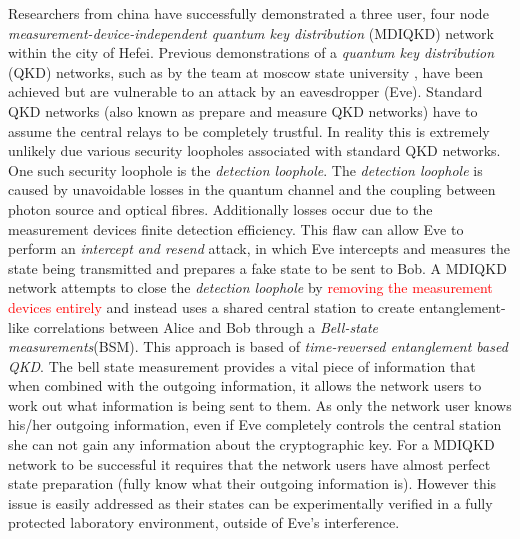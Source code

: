 \documentclass[journal]{vgtc}
\begin{document}
Researchers from china have successfully demonstrated a three user, four node \textit{measurement-device-independent quantum key distribution} (MDIQKD) network within the city of Hefei. Previous demonstrations of a \textit{quantum key distribution} (QKD) networks, such as by the team at moscow state university\cite{2017QuEle..47..798K} , have been achieved but are vulnerable to an attack by an eavesdropper (Eve). Standard QKD networks (also known as prepare and measure QKD networks) have to assume the central relays to be completely trustful. In reality this is extremely unlikely due various security loopholes associated with standard QKD networks. One such security loophole is the \textit{detection loophole}. The \textit{detection loophole} is caused by unavoidable losses in the quantum channel and  the coupling between photon source and optical fibres. Additionally losses occur due to the measurement devices finite detection efficiency. This flaw can allow Eve to perform an \textit{intercept and resend} attack, in which Eve intercepts and measures the state being transmitted and prepares a fake state to be sent to Bob. A MDIQKD network attempts to close the \textit{detection loophole} by \textcolor{red}{removing the measurement devices entirely} and instead uses a shared  central station to create entanglement-like correlations between Alice and Bob through a \textit{Bell-state measurements}(BSM). This approach is based of \textit{time-reversed entanglement based QKD}\cite{PhysRevA.54.2651}. The bell state measurement provides a vital piece of information that when combined with the outgoing information, it allows the network users to work out what information is being sent to them. As only the network user knows his/her outgoing information, even if Eve completely controls the central station she can not gain any information about the cryptographic key. For a MDIQKD network to be successful it requires that the network users have almost perfect state preparation (fully know what their outgoing information is). However this issue is easily addressed as their states can be experimentally verified in a fully protected laboratory environment, outside of Eve's interference.  
\end{document}
